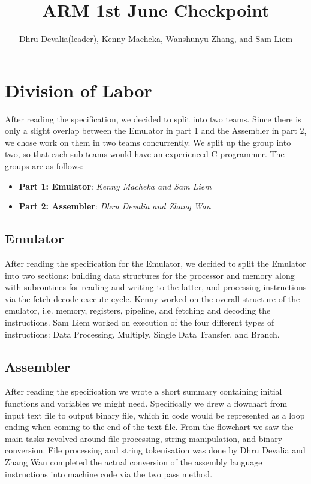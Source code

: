 \documentclass[a4paper]{article}
\title{ARM 1st June Checkpoint}
\author{Dhru Devalia(leader), Kenny Macheka, Wanshunyu Zhang, and Sam Liem}
\begin{document}
\maketitle
\section{Division of Labor}

After reading the specification, we decided to split into two teams. Since there is only a slight overlap between the Emulator in part 1 and the Assembler in part 2, we chose work on them in two teams concurrently. We split up the group into two, so that each sub-teams would have an experienced C programmer. The groups are as follows:
\begin{itemize}
\item \textbf{Part 1: Emulator}: \textit{Kenny Macheka and Sam Liem}
\item \textbf{Part 2: Assembler}: \textit{Dhru Devalia and Zhang Wan}
\end{itemize}

\subsection{Emulator}
After reading the specification for the Emulator, we decided to split the Emulator into two sections: building data structures for the processor and memory along with subroutines for reading and writing to the latter, and processing instructions via the fetch-decode-execute cycle. Kenny worked on the overall structure of the emulator, i.e. memory, registers, pipeline, and fetching and decoding the instructions.
Sam Liem worked on execution of the four different types of instructions: Data Processing, Multiply, Single Data Transfer, and Branch.
\subsection{Assembler}
After reading the specification we wrote a short summary containing initial functions and variables we might need. Specifically we drew a flowchart from input text file to output binary file, which in code would be represented as a loop ending when coming to the end of the text file. From the flowchart we saw the main tasks revolved around file processing, string manipulation, and binary conversion. File processing and string tokenisation was done by Dhru Devalia and Zhang Wan completed the actual conversion of the assembly language instructions into machine code via the two pass method. 
\end{document}
